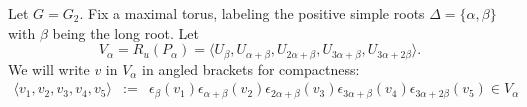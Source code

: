 \begin{example} Let $G=G_2$. Fix a maximal torus, labeling the positive simple roots $\Delta=\{\alpha, \beta\}$ with $\beta$ being the long root. Let 
	\begin{displaymath}
		V_\alpha = R_u(P_\alpha) = \langle U_\beta, U_{\alpha+\beta}, U_{2\alpha+\beta}, U_{3\alpha+\beta}, U_{3\alpha+2\beta}\rangle.
	\end{displaymath}
	We will write $v$ in $V_\alpha$ in angled brackets for compactness:
	\begin{eqnarray*}
		\langle 
		v_1,
		v_2,
		v_3,
		v_4,
		v_5
		\rangle &:=&
		\epsilon_{\beta}(v_1)
		\epsilon_{\alpha+\beta}(v_2)
		\epsilon_{2\alpha+\beta}(v_3)
		\epsilon_{3\alpha+\beta}(v_4)
		\epsilon_{3\alpha+2\beta}(v_5) \in V_\alpha
	\end{eqnarray*}


\end{example}
